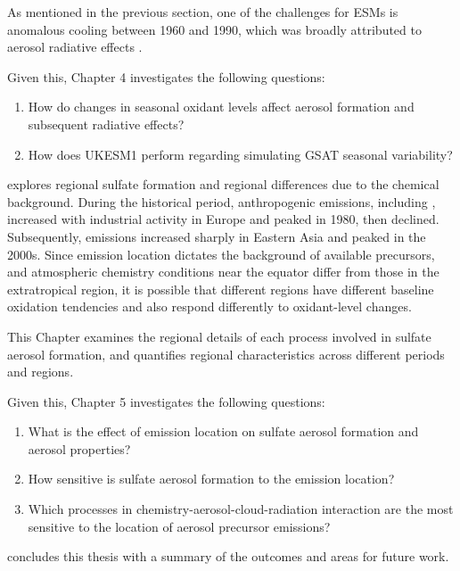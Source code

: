 \begin{description}
    As mentioned in the previous section, one of the challenges for ESMs is anomalous cooling between 1960 and 1990, which was broadly attributed to aerosol radiative effects \citep{zhangRoleAnthropogenicAerosols2021}. 

    Given this, Chapter 4 investigates the following questions: 

    \begin{enumerate}[resume]
        \item How do changes in seasonal oxidant levels affect aerosol formation and subsequent radiative effects?
        \item How does UKESM1 perform regarding simulating GSAT seasonal variability?
    \end{enumerate}

    \item[Chapter 5] explores regional sulfate formation and regional differences due to the chemical background. During the historical period, anthropogenic emissions, including , increased with industrial activity in Europe and peaked in 1980, then declined. Subsequently, emissions increased sharply in Eastern Asia and peaked in the 2000s. Since  emission location dictates the background of available precursors, and atmospheric chemistry conditions near the equator differ from those in the extratropical region, it is possible that different regions have different baseline oxidation tendencies and also respond differently to oxidant-level changes. 
    
    This Chapter examines the regional details of each process involved in sulfate aerosol formation, and quantifies regional characteristics across different periods and regions.  
        
    Given this, Chapter 5 investigates the following questions: 
    
   \begin{enumerate}[resume]
    \item What is the effect of emission location on sulfate aerosol formation and aerosol properties?
    \item How sensitive is sulfate aerosol formation to the emission location?
    \item Which processes in chemistry-aerosol-cloud-radiation interaction are the most sensitive to the location of aerosol precursor emissions?
    
    \end{enumerate}

    \item[Chapter 6] concludes this thesis with a summary of the outcomes and areas for future work.
\end{description}
